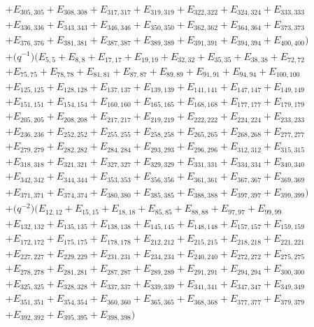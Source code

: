 \documentclass[pdftex]{sigma}
\numberwithin{equation}{section}
\theoremstyle{definition}
\begin{document}
\begin{align*}
&+E_{305,305}+E_{308,308}+E_{317,317}+E_{319,319}+E_{322,322}+E_{324,324}+E_{333,333}\\
&+E_{336,336}+E_{343,343}+E_{346,346}+E_{350,350}+E_{362,362}+E_{364,364}+E_{373,373}\\
&+E_{376,376}+E_{381,381}+E_{387,387}+E_{389,389}+E_{391,391}+E_{394,394}+E_{400,400})\\
&+\bigl(q^{-1}\bigr)(E_{5,5}+E_{8,8}+E_{17,17}+E_{19,19}+E_{32,32}+E_{35,35}+E_{38,38}+E_{72,72}\\
&+E_{75,75}+E_{78,78}+E_{81,81}+E_{87,87}+E_{89,89}+E_{91,91}+E_{94,94}+E_{100,100}\\
&+E_{125,125}+E_{128,128}+E_{137,137}+E_{139,139}+E_{141,141}+E_{147,147}+E_{149,149}\\
&+E_{151,151}+E_{154,154}+E_{160,160}+E_{165,165}+E_{168,168}+E_{177,177}+E_{179,179}\\
&+E_{205,205}+E_{208,208}+E_{217,217}+E_{219,219}+E_{222,222}+E_{224,224}+E_{233,233}\\
&+E_{236,236}+E_{252,252}+E_{255,255}+E_{258,258}+E_{265,265}+E_{268,268}+E_{277,277}\\
&+E_{279,279}+E_{282,282}+E_{284,284}+E_{293,293}+E_{296,296}+E_{312,312}+E_{315,315}\\
&+E_{318,318}+E_{321,321}+E_{327,327}+E_{329,329}+E_{331,331}+E_{334,334}+E_{340,340}\\
&+E_{342,342}+E_{344,344}+E_{353,353}+E_{356,356}+E_{361,361}+E_{367,367}+E_{369,369}\\
&+E_{371,371}+E_{374,374}+E_{380,380}+E_{385,385}+E_{388,388}+E_{397,397}+E_{399,399})\\
&+\bigl(q^{-2}\bigr)(E_{12,12}+E_{15,15}+E_{18,18}+E_{85,85}+E_{88,88}+E_{97,97}+E_{99,99}\\
&+E_{132,132}+E_{135,135}+E_{138,138}+E_{145,145}+E_{148,148}+E_{157,157}+E_{159,159}\\
&+E_{172,172}+E_{175,175}+E_{178,178}+E_{212,212}+E_{215,215}+E_{218,218}+E_{221,221}\\
&+E_{227,227}+E_{229,229}+E_{231,231}+E_{234,234}+E_{240,240}+E_{272,272}+E_{275,275}\\
&+E_{278,278}+E_{281,281}+E_{287,287}+E_{289,289}+E_{291,291}+E_{294,294}+E_{300,300}\\
&+E_{325,325}+E_{328,328}+E_{337,337}+E_{339,339}+E_{341,341}+E_{347,347}+E_{349,349}\\
&+E_{351,351}+E_{354,354}+E_{360,360}+E_{365,365}+E_{368,368}+E_{377,377}+E_{379,379}\\
&+E_{392,392}+E_{395,395}+E_{398,398})\\

\end{align*}
\end{document}
